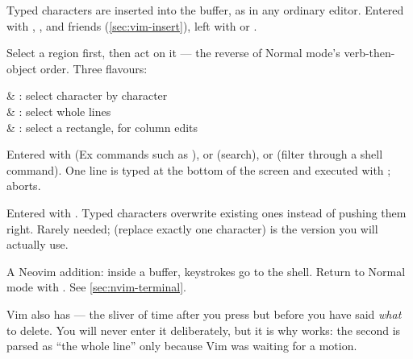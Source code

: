 \begin{definition}
	Typed characters are inserted into the buffer, as in any ordinary editor.
	Entered with , ,  and friends (\autoref{sec:vim-insert}),
	left with  or \key{<C-[>}.
\end{definition}

\begin{definition}
	Select a region first, then act on it --- the reverse of Normal mode's
	verb-then-object order. Three flavours:
	\begin{keys}[0.16]
		      & : select character by character                 \\
		      & : select whole lines                            \\
		  & : select a rectangle, for column edits         \\
	\end{keys}
\end{definition}

\begin{definition}
	Entered with \key{:} (Ex commands such as ), \key{/} or 
	(search), or \key{!} (filter through a shell command). One line is typed at the
	bottom of the screen and executed with ;  aborts.
\end{definition}

\begin{definition}
	Entered with . Typed characters overwrite existing ones instead of
	pushing them right. Rarely needed;  (replace exactly one character) is
	the version you will actually use.
\end{definition}

\begin{definition}
	A Neovim addition: inside a  buffer, keystrokes go to the shell.
	Return to Normal mode with  . See
	\autoref{sec:nvim-terminal}.
\end{definition}

\begin{remark}
	Vim also has  --- the sliver of time after you
	press  but before you have said \emph{what} to delete. You will never
	enter it deliberately, but it is why   works: the second 
	is parsed as ``the whole line'' only because Vim was waiting for a motion.
\end{remark}

